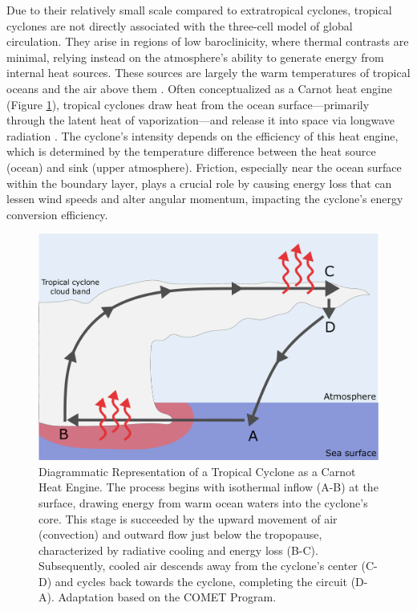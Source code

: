 Due to their relatively small scale compared to extratropical cyclones, tropical cyclones are not directly associated with the three-cell model of global circulation. They arise in regions of low baroclinicity, where thermal contrasts are minimal, relying instead on the atmosphere's ability to generate energy from internal heat sources. These sources are largely the warm temperatures of tropical oceans and the air above them \citep{palmen1969atmospheric}. Often conceptualized as a Carnot heat engine (Figure \ref{carnot_cycle}), tropical cyclones draw heat from the ocean surface—primarily through the latent heat of vaporization—and release it into space via longwave radiation \citep[e.g.,]{emanuel1987dependence,ozawa2015thermodynamics,wang2022tropical}. The cyclone's intensity depends on the efficiency of this heat engine, which is determined by the temperature difference between the heat source (ocean) and sink (upper atmosphere). Friction, especially near the ocean surface within the boundary layer, plays a crucial role by causing energy loss that can lessen wind speeds and alter angular momentum, impacting the cyclone's energy conversion efficiency.

\begin{figure}[h!]
\begin{center}
\setcaptionmargin{1cm}
\includegraphics[width=0.9\columnwidth,angle=0]{fig/carnot_cycle.pdf}
\caption[Tropical Cyclone as a Carnot Cycle]{Diagrammatic Representation of a Tropical Cyclone as a Carnot Heat Engine. The process begins with isothermal inflow (A-B) at the surface, drawing energy from warm ocean waters into the cyclone's core. This stage is succeeded by the upward movement of air (convection) and outward flow just below the tropopause, characterized by radiative cooling and energy loss (B-C). Subsequently, cooled air descends away from the cyclone's center (C-D) and cycles back towards the cyclone, completing the circuit (D-A). Adaptation based on the COMET Program.}
\label{carnot_cycle}
\end{center}
\end{figure}


